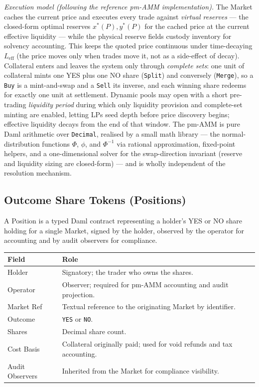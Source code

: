 \documentclass[11pt,a4paper]{article}
\begin{document}
\emph{Execution model (following the reference pm-AMM implementation).} The Market caches the current price and executes every trade against \emph{virtual reserves} --- the closed-form optimal reserves $x^*(P), y^*(P)$ for the cached price at the current effective liquidity --- while the physical reserve fields custody inventory for solvency accounting. This keeps the quoted price continuous under time-decaying $L_{\mathrm{eff}}$ (the price moves only when trades move it, not as a side-effect of decay). Collateral enters and leaves the system only through \emph{complete sets}: one unit of collateral mints one YES plus one NO share (\texttt{Split}) and conversely (\texttt{Merge}), so a \texttt{Buy} is a mint-and-swap and a \texttt{Sell} its inverse, and each winning share redeems for exactly one unit at settlement. Dynamic pools may open with a short pre-trading \emph{liquidity period} during which only liquidity provision and complete-set minting are enabled, letting LPs seed depth before price discovery begins; effective liquidity decays from the end of that window. The pm-AMM is pure Daml arithmetic over \texttt{Decimal}, realised by a small math library --- the normal-distribution functions $\Phi$, $\phi$, and $\Phi^{-1}$ via rational approximation, fixed-point helpers, and a one-dimensional solver for the swap-direction invariant (reserve and liquidity sizing are closed-form) --- and is wholly independent of the resolution mechanism.

\subsection{Outcome Share Tokens (Positions)}

A Position is a typed Daml contract representing a holder's YES or NO share holding for a single Market, signed by the holder, observed by the operator for accounting and by audit observers for compliance.

\vspace{0.3em}
\begin{center}
\begin{tabular}{p{3.5cm} p{10.5cm}}
\toprule
\textbf{Field} & \textbf{Role} \\
\midrule
Holder & Signatory; the trader who owns the shares. \\
Operator & Observer; required for pm-AMM accounting and audit projection. \\
Market Ref & Textual reference to the originating Market by identifier. \\
Outcome & \texttt{YES} or \texttt{NO}. \\
Shares & Decimal share count. \\
Cost Basis & Collateral originally paid; used for void refunds and tax accounting. \\
Audit Observers & Inherited from the Market for compliance visibility. \\
\bottomrule
\end{tabular}
\end{center}
\end{document}
